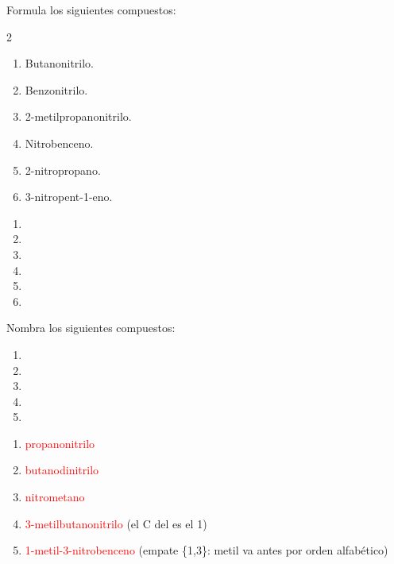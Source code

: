 \begin{exercise}
    Formula los siguientes compuestos:
    \begin{multicols}{2}
        \begin{enumerate}[label=\alph*)]
            \item Butanonitrilo.
            \item Benzonitrilo.
            \item 2-metilpropanonitrilo.
            \item Nitrobenceno.
            \item 2-nitropropano.
            \item 3-nitropent-1-eno.
        \end{enumerate}
    \end{multicols}
    \begin{solu}
        \begin{enumerate}[label=\alph*)]
            \item {}
            \item {}
            \item {}
            \item {}
            \item {}
            \item {}
        \end{enumerate}
    \end{solu}
\end{exercise}

\begin{exercise}
    Nombra los siguientes compuestos:
    \begin{enumerate}[label=\alph*)]
        \item {}
        \item {}
        \item {}
        \item {}
        \item {}
    \end{enumerate}
    \begin{solu}
        \begin{enumerate}[label=\alph*)]
            \item \textcolor{red}{propanonitrilo}
            \item \textcolor{red}{butanodinitrilo}
            \item \textcolor{red}{nitrometano}
            \item \textcolor{red}{3-metilbutanonitrilo} (el C del  es el 1)
            \item \textcolor{red}{1-metil-3-nitrobenceno} (empate \{1,3\}: metil va antes por orden alfabético)
        \end{enumerate}
    \end{solu}
\end{exercise}

